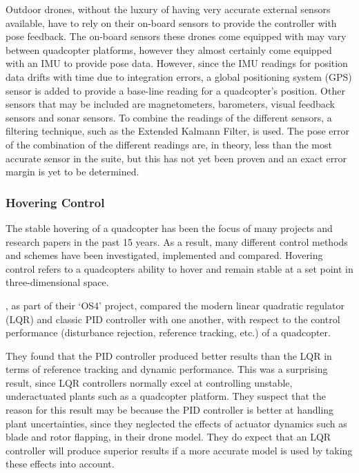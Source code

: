 Outdoor drones, without the luxury of having very accurate external sensors available, have to rely on their on-board sensors to provide the controller with pose feedback. The on-board sensors these drones come equipped with may vary between quadcopter platforms, however they almost certainly come equipped with an IMU to provide pose data. However, since the IMU readings for position data drifts with time due to integration errors, a global positioning system (GPS) sensor is added to provide a base-line reading for a quadcopter's position. Other sensors that may be included are magnetometers, barometers, visual feedback sensors and sonar sensors. To combine the readings of the different sensors, a filtering technique, such as the Extended Kalmann Filter, is used. The pose error of the combination of the different readings are, in theory, less than the most accurate sensor in the suite, but this has not yet been proven and an exact error margin is yet to be determined. 

\subsubsection{Hovering Control}

The stable hovering of a quadcopter has been the focus of many projects and research papers in the past 15 years. As a result, many different control methods and schemes have been investigated, implemented and compared. Hovering control refers to a quadcopters ability to hover and remain stable at a set point in three-dimensional space.

\cite{bouabdallah2004pid}, as part of their `OS4' project, compared the modern linear quadratic regulator (LQR) and classic PID controller with one another, with respect to the control performance (disturbance rejection, reference tracking, etc.) of a quadcopter.

They found that the PID controller produced better results than the LQR in terms of reference tracking and dynamic performance. This was a surprising result, since LQR controllers normally excel at controlling unstable, underactuated plants such as a quadcopter platform. They suspect that the reason for this result may be because the PID controller is better at handling plant uncertainties, since they neglected the effects of actuator dynamics such as blade and rotor flapping, in their drone model. They do expect that an LQR controller will produce superior results if a more accurate model is used by taking these effects into account. 

